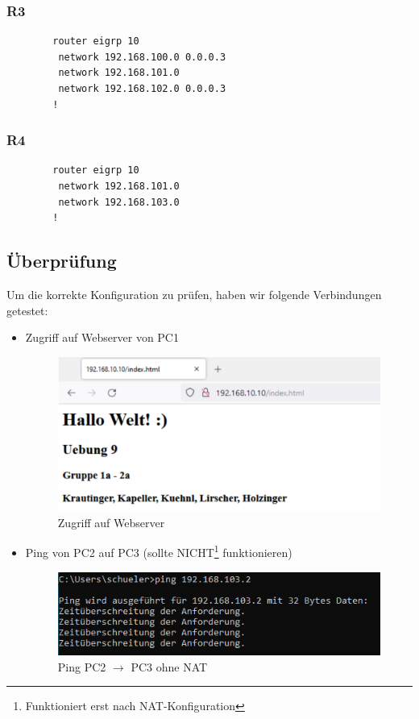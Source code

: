 \documentclass[a4paper, ngerman]{article}
\begin{document}
\subsubsection{R3}
\begin{framed}
    \begin{verbatim}
        router eigrp 10
         network 192.168.100.0 0.0.0.3
         network 192.168.101.0
         network 192.168.102.0 0.0.0.3
        !
    \end{verbatim}
\end{framed}
\subsubsection{R4}
\begin{framed}
    \begin{verbatim}
        router eigrp 10
         network 192.168.101.0
         network 192.168.103.0
        !
    \end{verbatim}
\end{framed}

\subsection{Überprüfung}
Um die korrekte Konfiguration zu prüfen, haben wir folgende Verbindungen getestet:
\begin{itemize}
    \item Zugriff auf Webserver von PC1
          \begin{figure}[H]
              \centering
              \includegraphics[scale=0.2]{screenshots/webserver_zugriff.png}
              \caption{Zugriff auf Webserver}
          \end{figure}
    \item Ping von PC2 auf PC3 (sollte NICHT\footnote{Funktioniert erst nach NAT-Konfiguration} funktionieren)
          \begin{figure}[H]
              \centering
              \includegraphics[scale=0.7]{screenshots/before nat.PNG}
              \caption{Ping PC2 $\rightarrow$ PC3 ohne NAT}
          \end{figure}
\end{itemize}
\end{document}
